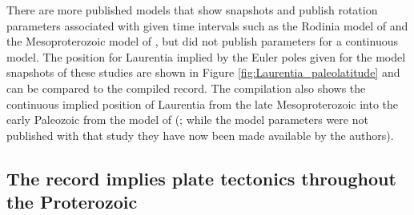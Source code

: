 \documentclass[11pt,letterpaper]{article}
\begin{document}
There are more published models that show snapshots and publish rotation parameters associated with given time intervals such as the Rodinia model of \cite{Li2008a} and the Mesoproterozoic model of \cite{Pisarevsky2014b}, but did not publish parameters for a continuous model. The position for Laurentia implied by the Euler poles given for the model snapshots of these studies are shown in Figure \ref{fig:Laurentia_paleolatitude} and can be compared to the compiled record. The compilation also shows the continuous implied position of Laurentia from the late Mesoproterozoic into the early Paleozoic from the model of (\citealp{Li2013a}; while the model parameters were not published with that study they have now been made available by the authors).

\subsection{The record implies plate tectonics throughout the Proterozoic}
\end{document}
